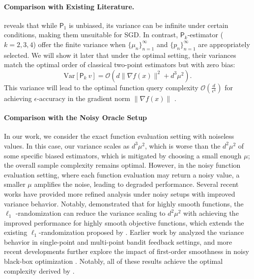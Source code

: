 \documentclass{article}
\newcommand{\Var}{\mathrm{Var}}
\newcommand{\calO}{\mathcal{O}}
\theoremstyle{definition}
\theoremstyle{plain}
\theoremstyle{remark}
\newcommand{\sfP}{\mathsf{P}}
\begin{document}
\paragraph{Comparison with Existing Literature.}  
 reveals that while $\mathsf{P}_1$ is unbiased, its variance can be infinite under certain conditions, making them unsuitable for SGD. In contrast, $\mathsf{P}_k$-estimator ($k=2,3,4$) offer the finite variance when $\{ \mu_n\}_{n=1}^\infty$ and $\{ p_n\}_{n=1}^\infty$ are appropriately selected. We will show it later that under the optimal setting, their variances match the optimal order of classical two-point estimators \citep{nesterov2017random} but with zero bias:  
$$\Var[\sfP_k \ v] = \calO(d\|\nabla f(x)\|^2 + d^3 \mu^2).$$
This variance will lead to the optimal function query complexity $\calO(\frac{d}{\epsilon^4})$ for achieving  $\epsilon$-accuracy in the gradient norm $\| \nabla f(x)\|$ \citep{duchi2015optimal}.


\paragraph{Comparison with the Noisy Oracle Setup}  In our work, we consider the exact function evaluation setting with noiseless values. In this case, our variance scales as $d^3 \mu^2$, which is worse than the $d^2 \mu^2$ of some specific biased estimators, which is mitigated by choosing a small enough $\mu$; the overall sample complexity remains optimal. However, in the noisy function evaluation setting, where each function evaluation may return a noisy value, a smaller $\mu$ amplifies the noise, leading to degraded performance. Several recent works have provided more refined analysis under noisy setups with improved variance behavior. Notably,  \citet{akhavan2024gradient} demonstrated that for highly smooth functions, the $\ell_1$ -randomization can reduce the variance scaling to $d^2 \mu^2$ with achieving the improved performance for highly smooth objective functions, which extends the existing $\ell_1$-randomization proposed by \citet{akhavan2022gradient}. Earlier work by \citet{gasnikov2017stochastic} analyzed the variance behavior in single-point and multi-point bandit feedback settings, and more recent developments further explore the impact of first-order smoothness in noisy black-box optimization \citep{gasnikov2022randomized}. Notably, all of these results achieve the optimal complexity derived by \citet{duchi2015optimal}. 
\end{document}
